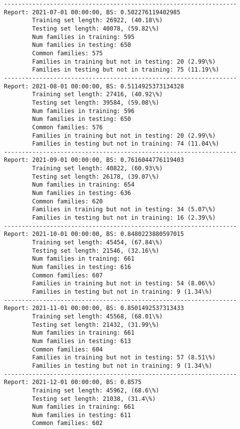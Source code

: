 \documentclass[11pt]{article}
\begin{document}
    \begin{Verbatim}[commandchars=\\\{\}]
------------------------------------------------------------------
Report: 2021-07-01 00:00:00, BS: 0.502276119402985
        Training set length: 26922, (40.18\%)
        Testing set length: 40078, (59.82\%)
        Num families in training: 595
        Num families in testing: 650
        Common families: 575
        Families in training but not in testing: 20 (2.99\%)
        Families in testing but not in training: 75 (11.19\%)
------------------------------------------------------------------
Report: 2021-08-01 00:00:00, BS: 0.5114925373134328
        Training set length: 27416, (40.92\%)
        Testing set length: 39584, (59.08\%)
        Num families in training: 596
        Num families in testing: 650
        Common families: 576
        Families in training but not in testing: 20 (2.99\%)
        Families in testing but not in training: 74 (11.04\%)
------------------------------------------------------------------
Report: 2021-09-01 00:00:00, BS: 0.7616044776119403
        Training set length: 40822, (60.93\%)
        Testing set length: 26178, (39.07\%)
        Num families in training: 654
        Num families in testing: 636
        Common families: 620
        Families in training but not in testing: 34 (5.07\%)
        Families in testing but not in training: 16 (2.39\%)
------------------------------------------------------------------
Report: 2021-10-01 00:00:00, BS: 0.8480223880597015
        Training set length: 45454, (67.84\%)
        Testing set length: 21546, (32.16\%)
        Num families in training: 661
        Num families in testing: 616
        Common families: 607
        Families in training but not in testing: 54 (8.06\%)
        Families in testing but not in training: 9 (1.34\%)
------------------------------------------------------------------
Report: 2021-11-01 00:00:00, BS: 0.8501492537313433
        Training set length: 45568, (68.01\%)
        Testing set length: 21432, (31.99\%)
        Num families in training: 661
        Num families in testing: 613
        Common families: 604
        Families in training but not in testing: 57 (8.51\%)
        Families in testing but not in training: 9 (1.34\%)
------------------------------------------------------------------
Report: 2021-12-01 00:00:00, BS: 0.8575
        Training set length: 45962, (68.6\%)
        Testing set length: 21038, (31.4\%)
        Num families in training: 661
        Num families in testing: 611
        Common families: 602

\end{Verbatim}
\end{document}
